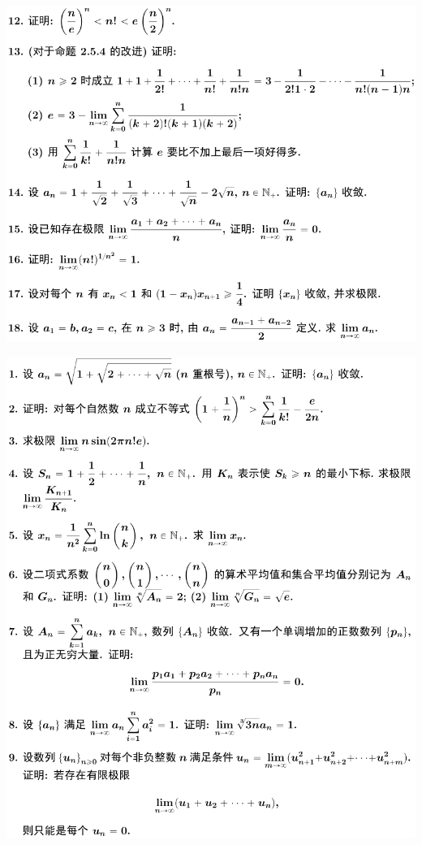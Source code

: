 \documentclass[11pt,a4paper]{ctexart}
\begin{document}
\begin{paracol}{2}
\includegraphics[width=\linewidth]{figure10.png}
\newpage
{}

\includegraphics[width=\linewidth]{figure11.png}
\newpage
{}


\end{paracol}
\end{document}
